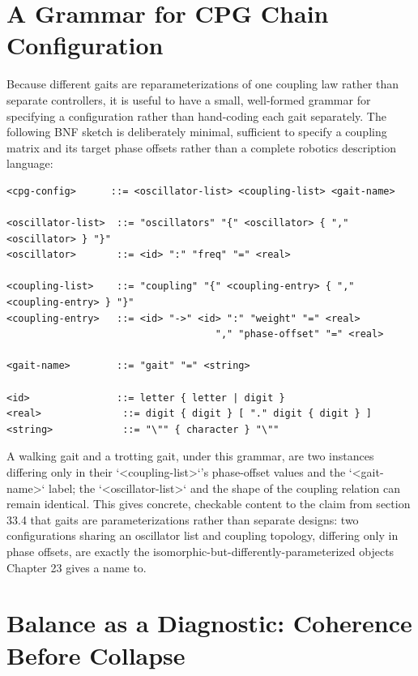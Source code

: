 \section{A Grammar for CPG Chain Configuration}

Because different gaits are reparameterizations of one coupling law rather than separate controllers, it is useful to have a small, well-formed grammar for specifying a configuration rather than hand-coding each gait separately. The following BNF sketch is deliberately minimal, sufficient to specify a coupling matrix and its target phase offsets rather than a complete robotics description language:

\begin{Verbatim}[breaklines=true, breaksymbolleft={}, fontsize=\small]
<cpg-config>      ::= <oscillator-list> <coupling-list> <gait-name>

<oscillator-list>  ::= "oscillators" "{" <oscillator> { "," <oscillator> } "}"
<oscillator>       ::= <id> ":" "freq" "=" <real>

<coupling-list>    ::= "coupling" "{" <coupling-entry> { "," <coupling-entry> } "}"
<coupling-entry>   ::= <id> "->" <id> ":" "weight" "=" <real>
                                    "," "phase-offset" "=" <real>

<gait-name>        ::= "gait" "=" <string>

<id>               ::= letter { letter | digit }
<real>              ::= digit { digit } [ "." digit { digit } ]
<string>            ::= "\"" { character } "\""
\end{Verbatim}

A walking gait and a trotting gait, under this grammar, are two instances differing only in their `<coupling-list>`'s phase-offset values and the `<gait-name>` label; the `<oscillator-list>` and the shape of the coupling relation can remain identical. This gives concrete, checkable content to the claim from section 33.4 that gaits are parameterizations rather than separate designs: two configurations sharing an oscillator list and coupling topology, differing only in phase offsets, are exactly the isomorphic-but-differently-parameterized objects Chapter 23 gives a name to.

\section{Balance as a Diagnostic: Coherence Before Collapse}

